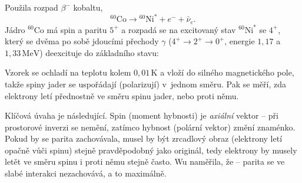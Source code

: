 Použila rozpad $\beta^-$ kobaltu,
\begin{equation}
  {}^{60}\mathrm{Co} \to {}^{60}\mathrm{Ni}^* + e^- + \bar\nu_e .
\end{equation}
Jádro ${}^{60}\mathrm{Co}$ má spin a paritu $5^+$ a rozpadá se na excitovaný stav ${}^{60}\mathrm{Ni}^*$ se $4^+$, který se dvěma po sobě jdoucími přechody $\gamma$ ($4^+\to2^+\to0^+$, energie $1{,}17$ a $1{,}33\,\mathrm{MeV}$) deexcituje do základního stavu:
\begin{center}
\end{center}
Vzorek se ochladí na teplotu kolem $0{,}01\,\mathrm{K}$ a vloží do silného magnetického pole, takže spiny jader se uspořádají (polarizují) v~jednom směru. Pak se měří, zda elektrony letí přednostně ve směru spinu jader, nebo proti němu.

Klíčová úvaha je následující. Spin (moment hybnosti) je \emph{axiální} vektor -- při prostorové inverzi se nemění, zatímco hybnost (polární vektor) změní znaménko. Pokud by se parita zachovávala, musel by být zrcadlový obraz (elektrony letí opačně vůči spinu) stejně pravděpodobný jako originál, tedy elektrony by musely letět ve směru spinu i proti němu stejně často. Wu naměřila, že  -- parita se ve slabé interakci nezachovává, a to maximálně.

